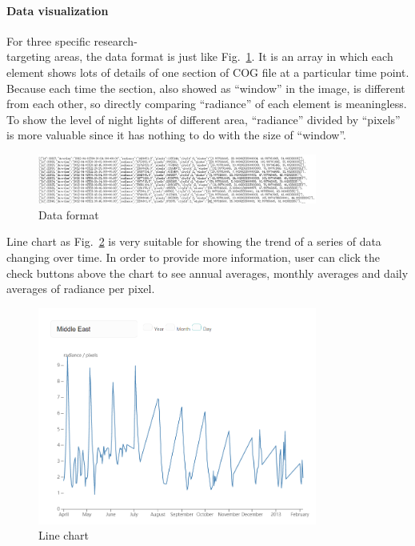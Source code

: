 \documentclass[conference]{IEEEtran}
\begin{document}
\paragraph{Data visualization}

For three specific research-\\ targeting areas, the data format is just like Fig.~\ref{dffg}. It is an array in which 
each element shows lots of details of one section of COG file at a particular time point. Because each time the section, also showed 
as “window” in the image, is different from each other, so directly comparing “radiance” of each element is meaningless. To show the 
level of night lights of different area, “radiance” divided by “pixels” is more valuable since it has nothing to do with the size of 
“window”.

\begin{figure}[htbp]
    \centerline{\includegraphics[width=260pt]{images/Data_format_frontend_get.png}}
    \caption{Data format}
    \label{dffg}
\end{figure}
 
Line chart as Fig.~\ref{lchart} is very suitable for showing the trend of a series of data changing over time. In order to provide more 
information, user can click the check buttons above the chart to see annual averages, monthly averages and daily averages of radiance 
per pixel.  

\begin{figure}[htbp]
    \centerline{\includegraphics[width=260pt]{images/Line_chart.png}}
    \caption{Line chart}
    \label{lchart}
\end{figure}
\end{document}
